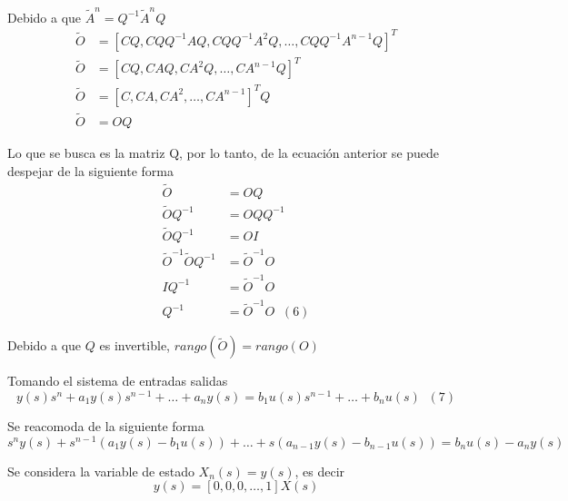 Debido a que \( \tilde{A}^{n} = Q^{-1}\tilde{A}^{n}Q \)
\[
    \begin{split}
        \tilde{O} & = [CQ, CQQ^{-1}AQ, CQQ^{-1}A^{2}Q, \ldots, CQQ^{-1}A^{n-1}Q]^{T}\\
        \tilde{O} & = [CQ, CAQ, CA^{2}Q, \ldots, CA^{n-1}Q]^{T}\\
        \tilde{O} & = [C, CA, CA^{2}, \ldots, CA^{n-1}]^{T}Q\\
        \tilde{O} & = OQ 
    \end{split}
\]

Lo que se busca es la matriz Q, por lo tanto, de la ecuación anterior se puede despejar de la siguiente forma
\[
    \begin{split}
        \tilde{O} & = OQ \\
        \tilde{O}Q^{-1} & = OQQ^{-1} \\
        \tilde{O}Q^{-1} & = OI \\
        \tilde{O}^{-1}\tilde{O}Q^{-1} & = \tilde{O}^{-1}O\\
        IQ^{-1} & = \tilde{O}^{-1}O\\
        Q^{-1} & = \tilde{O}^{-1}O \;\;(6)
    \end{split}
\]

Debido a que \( Q \) es invertible, \( rango(\tilde{O}) = rango(O)\) 

Tomando el sistema de entradas salidas
\[
    y(s)s^{n} + a_{1}y(s)s^{n-1} + \ldots + a_{n}y(s) = b_{1}u(s)s^{n-1} + \ldots + b_{n}u(s) \;\;(7)
\]

Se reacomoda de la siguiente forma
\[
    s^{n}y(s) + s^{n-1}(a_{1}y(s)-b_{1}u(s)) + \ldots + s(a_{n-1}y(s)-b_{n-1}u(s)) = b_{n}u(s)-a_{n}y(s) 
\]

Se considera la variable de estado \( X_{n}(s) = y(s) \), es decir
\[
    y(s) = [0,0,0,\ldots,1]X(s)
\]

